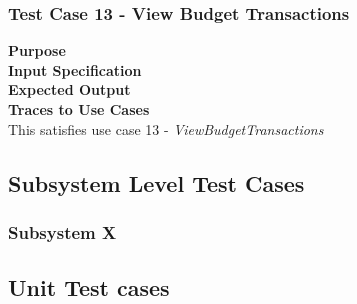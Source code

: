 \documentclass[12pt]{article}
\begin{document}
\subsubsection{Test Case 13 - View Budget Transactions} \label{TC-13}
\noindent
{\bf Purpose}\\
                                                        
\noindent
{\bf Input Specification}\\

\noindent
{\bf Expected Output}\\

\noindent
{\bf Traces to Use Cases}\\
This satisfies use case 13 - \textit{ViewBudgetTransactions}


\subsection{Subsystem Level Test Cases}

\subsubsection{Subsystem X}
\clearpage
\subsection{Unit Test cases}

\end{document}
